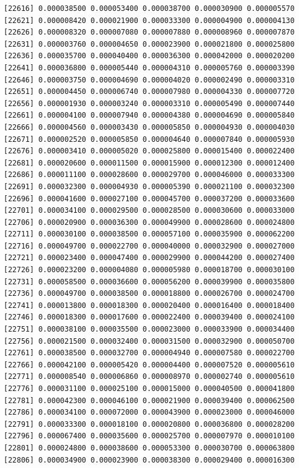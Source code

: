 \documentclass[]{article}
\begin{document}
\begin{verbatim}
[22616] 0.000038500 0.000053400 0.000038700 0.000030900 0.000005570
[22621] 0.000008420 0.000021900 0.000033300 0.000004900 0.000004130
[22626] 0.000008320 0.000007080 0.000007880 0.000008960 0.000007870
[22631] 0.000003760 0.000004650 0.000023900 0.000021800 0.000025800
[22636] 0.000035700 0.000040400 0.000036300 0.000042000 0.000020200
[22641] 0.000036800 0.000005440 0.000004310 0.000005760 0.000003390
[22646] 0.000003750 0.000004690 0.000004020 0.000002490 0.000003310
[22651] 0.000004450 0.000006740 0.000007980 0.000004330 0.000007720
[22656] 0.000001930 0.000003240 0.000003310 0.000005490 0.000007440
[22661] 0.000004100 0.000007940 0.000004380 0.000004690 0.000005840
[22666] 0.000004560 0.000003430 0.000005850 0.000004930 0.000004030
[22671] 0.000002520 0.000005850 0.000004640 0.000007840 0.000005930
[22676] 0.000003410 0.000005020 0.000025800 0.000015400 0.000022400
[22681] 0.000020600 0.000011500 0.000015900 0.000012300 0.000012400
[22686] 0.000011100 0.000028600 0.000029700 0.000046000 0.000033300
[22691] 0.000032300 0.000004930 0.000005390 0.000021100 0.000032300
[22696] 0.000041600 0.000027100 0.000045700 0.000037200 0.000033600
[22701] 0.000034100 0.000029500 0.000028500 0.000030600 0.000033000
[22706] 0.000020900 0.000036300 0.000049900 0.000028600 0.000024800
[22711] 0.000030100 0.000038500 0.000057100 0.000035900 0.000062200
[22716] 0.000049700 0.000022700 0.000040000 0.000032900 0.000027000
[22721] 0.000023400 0.000047400 0.000029900 0.000044200 0.000027400
[22726] 0.000023200 0.000004080 0.000005980 0.000018700 0.000030100
[22731] 0.000058500 0.000036600 0.000056200 0.000039900 0.000035800
[22736] 0.000049700 0.000038500 0.000018800 0.000026700 0.000024700
[22741] 0.000013800 0.000018300 0.000020400 0.000016400 0.000018400
[22746] 0.000018300 0.000017600 0.000022400 0.000039400 0.000024100
[22751] 0.000038100 0.000035500 0.000023000 0.000033900 0.000034400
[22756] 0.000021500 0.000032400 0.000031500 0.000032900 0.000050700
[22761] 0.000038500 0.000032700 0.000004940 0.000007580 0.000022700
[22766] 0.000042100 0.000005420 0.000004400 0.000007520 0.000005610
[22771] 0.000008540 0.000006860 0.000008970 0.000002740 0.000005610
[22776] 0.000031100 0.000025100 0.000015000 0.000040500 0.000041800
[22781] 0.000042300 0.000046100 0.000021900 0.000039400 0.000062500
[22786] 0.000034100 0.000072000 0.000043900 0.000023000 0.000046000
[22791] 0.000033300 0.000018100 0.000020800 0.000036800 0.000028200
[22796] 0.000067400 0.000035600 0.000025700 0.000007970 0.000010100
[22801] 0.000024800 0.000038600 0.000053300 0.000030700 0.000063800
[22806] 0.000034900 0.000023900 0.000038300 0.000029400 0.000016300

\end{verbatim}
\end{document}
